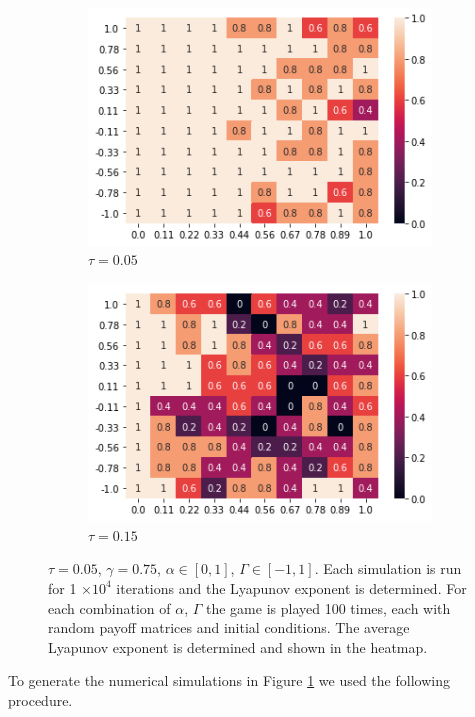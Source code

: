 \documentclass[letterpaper]{article} %
\begin{document}
\begin{figure}[h]
    \centering
     \begin{subfigure}[b]{0.45 \textwidth}
    \centering
    \includegraphics[width = 0.7 \textwidth]{Figures/AlphaRun_tau_005.png}
    \caption{$\tau = 0.05$}
    \end{subfigure}
    \begin{subfigure}[b]{0.45 \textwidth}
    \centering
    \includegraphics[width = 0.7 \textwidth]{Figures/tau_015.png}
    \caption{$\tau = 0.15$}
    \end{subfigure}

    \caption{$\tau = 0.05$, $\gamma = 0.75$, $\alpha \in [0, 1]$, $\Gamma \in [-1, 1]$. Each
    simulation is run for 1 $\times 10^4$ iterations and the Lyapunov exponent is determined. For each
    combination of $\alpha$, $\Gamma$ the game is played 100 times, each with random payoff matrices
    and initial conditions. The average Lyapunov exponent is determined and shown in the heatmap.
    \label{fig::NumericalExperiments}}
\end{figure}

   To generate the numerical simulations in Figure \ref{fig::NumericalExperiments} we used the
   following procedure.
\end{document}
